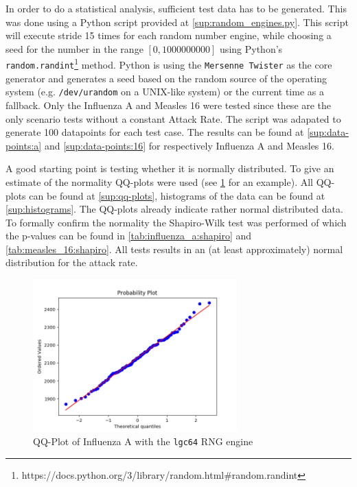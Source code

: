 \documentclass[natbib=true]{acmart}
\begin{document}
In order to do a statistical analysis, sufficient test data has to be generated. This was done using a Python script provided at \ref{sup:random_engines.py}. 
This script will execute stride 15 times for each random number engine, while choosing a seed for the number in the range \([0, 1000000000]\) using Python's \texttt{random.randint}\footnote{https://docs.python.org/3/library/random.html\#random.randint} method.
Python is using the \texttt{Mersenne Twister} as the core generator and generates a seed based on the random source of the operating system (e.g. \texttt{/dev/urandom} on a UNIX-like system) or the current time as a fallback.
Only the Influenza A and Measles 16 were tested since these are the only scenario tests without a constant Attack Rate. 
The script was adapated to generate 100 datapoints for each test case. The results can be found at \ref{sup:data-points:a} and \ref{sup:data-points:16} for respectively Influenza A and Measles 16.

A good starting point is testing whether it is normally distributed.
To give an estimate of the normality QQ-plots were used (see \cref{img:qq-plot:influenza_a} for an example). All QQ-plots can be found at \ref{sup:qq-plots}, histograms of the data can be found at \ref{sup:histograms}.
The QQ-plots already indicate rather normal distributed data. To formally confirm the normality the Shapiro-Wilk test was performed of which the p-values can be found in \cref{tab:influenza_a:shapiro} and \cref{tab:measles_16:shapiro}. 
All tests results in an (at least approximately) normal distribution for the attack rate.

\begin{figure}[!hbt]
    \centering
    \includegraphics[width=0.7\textwidth]{images/influenza_a_qq_lgc64.png}
    \caption{QQ-Plot of Influenza A with the \texttt{lgc64} RNG engine}
    \label{img:qq-plot:influenza_a}
\end{figure}
\end{document}

